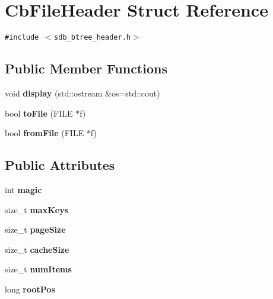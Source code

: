 \hypertarget{structCbFileHeader}{
\section{CbFileHeader Struct Reference}
\label{structCbFileHeader}
}
{\tt \#include $<$sdb\_\-btree\_\-header.h$>$}

\subsection*{Public Member Functions}
\begin{CompactItemize}
\item 
\hypertarget{structCbFileHeader_a2d2ced8667d32f2973239aae63cbd78}{
void \textbf{display} (std::ostream \&os=std::cout)}
\label{structCbFileHeader_a2d2ced8667d32f2973239aae63cbd78}

\item 
\hypertarget{structCbFileHeader_dd698742ead207c746522c7afa1ea05d}{
bool \textbf{toFile} (FILE $\ast$f)}
\label{structCbFileHeader_dd698742ead207c746522c7afa1ea05d}

\item 
\hypertarget{structCbFileHeader_c585ce6ad0d5abbf82355ef42b38230d}{
bool \textbf{fromFile} (FILE $\ast$f)}
\label{structCbFileHeader_c585ce6ad0d5abbf82355ef42b38230d}

\end{CompactItemize}
\subsection*{Public Attributes}
\begin{CompactItemize}
\item 
\hypertarget{structCbFileHeader_f970fdfde77084c5315ab2eba15edd34}{
int \textbf{magic}}
\label{structCbFileHeader_f970fdfde77084c5315ab2eba15edd34}

\item 
\hypertarget{structCbFileHeader_adc85e4078d3d20c5565b6fa7fbdb44f}{
size\_\-t \textbf{maxKeys}}
\label{structCbFileHeader_adc85e4078d3d20c5565b6fa7fbdb44f}

\item 
\hypertarget{structCbFileHeader_2fa43141056327e7de46d90a05f509d5}{
size\_\-t \textbf{pageSize}}
\label{structCbFileHeader_2fa43141056327e7de46d90a05f509d5}

\item 
\hypertarget{structCbFileHeader_a8f04deba2660f6e93df96dd3c9c1773}{
size\_\-t \textbf{cacheSize}}
\label{structCbFileHeader_a8f04deba2660f6e93df96dd3c9c1773}

\item 
\hypertarget{structCbFileHeader_fe3e44b130bdc77790a20ea79d7531d7}{
size\_\-t \textbf{numItems}}
\label{structCbFileHeader_fe3e44b130bdc77790a20ea79d7531d7}

\item 
\hypertarget{structCbFileHeader_65dfa15c6f5d1456a4e327d8f1e95888}{
long \textbf{rootPos}}
\label{structCbFileHeader_65dfa15c6f5d1456a4e327d8f1e95888}

\end{CompactItemize}
